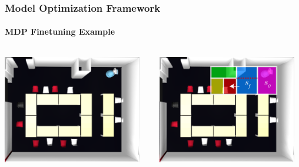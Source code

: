 \begin{frame}
\frametitle{Model Optimization Framework}
\framesubtitle{MDP Finetuning Example}

\begin{columns}
	\begin{column}{0.5\textwidth}
		\includegraphics[width=0.95\textwidth]{figures/implementation/uol_bl_phase_3_small}
	\end{column}
	\begin{column}{0.5\textwidth}
		\includegraphics[width=0.95\textwidth]{figures/implementation/uol_bl_phase_3_2_smallv6.pdf}
	\end{column}
\end{columns}

\end{frame}

